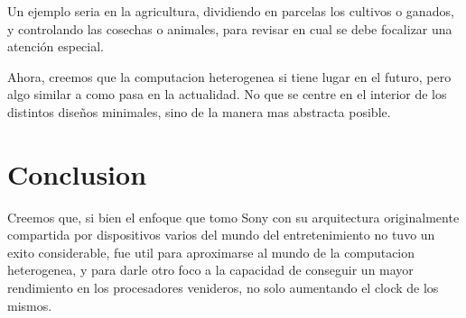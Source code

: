 \documentclass[10pt,compsoc]{IEEEtran}
\begin{document}
	Un ejemplo seria en la agricultura, dividiendo en parcelas los cultivos o ganados, y controlando las cosechas o animales, para revisar en cual se debe focalizar una atención especial.\newline
	
	Ahora, creemos que la computacion heterogenea si tiene lugar en el futuro, pero algo similar a como pasa en la actualidad. No que se centre en el interior de los distintos diseños minimales, sino de la manera mas abstracta posible.
	
	
	\section{Conclusion}
	\noindent Creemos que, si bien el enfoque que tomo Sony con su arquitectura originalmente compartida por dispositivos varios del mundo del entretenimiento no tuvo un exito considerable, fue util para aproximarse al mundo de la computacion heterogenea, y para darle otro foco a la capacidad de conseguir un mayor rendimiento en los procesadores venideros, no solo aumentando el clock de los mismos.
	
\end{document}
